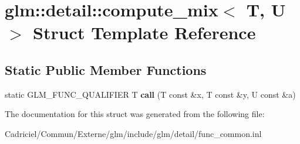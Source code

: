 \hypertarget{structglm_1_1detail_1_1compute__mix}{}\section{glm\+:\+:detail\+:\+:compute\+\_\+mix$<$ T, U $>$ Struct Template Reference}
\label{structglm_1_1detail_1_1compute__mix}
\subsection*{Static Public Member Functions}
\begin{DoxyCompactItemize}
\item 
static G\+L\+M\+\_\+\+F\+U\+N\+C\+\_\+\+Q\+U\+A\+L\+I\+F\+I\+ER T {\bfseries call} (T const \&x, T const \&y, U const \&a)\hypertarget{structglm_1_1detail_1_1compute__mix_a13fd963d8385f36486509a48fd68da1c}{}\label{structglm_1_1detail_1_1compute__mix_a13fd963d8385f36486509a48fd68da1c}

\end{DoxyCompactItemize}


The documentation for this struct was generated from the following file\+:\begin{DoxyCompactItemize}
\item 
Cadriciel/\+Commun/\+Externe/glm/include/glm/detail/func\+\_\+common.\+inl\end{DoxyCompactItemize}
